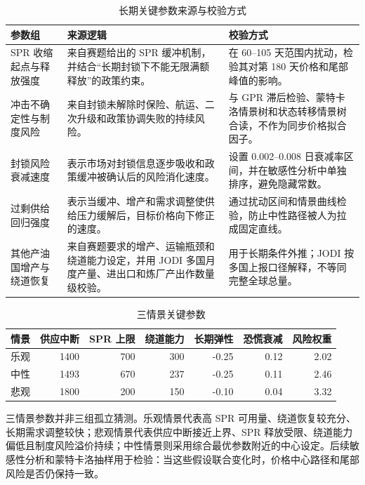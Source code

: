\begin{table}[htbp]
\centering
\caption{长期关键参数来源与校验方式}
\label{tab:long-parameter-audit}
\begin{tabularx}{\linewidth}{lX X}
\toprule
参数组 & 来源逻辑 & 校验方式 \\
\midrule
SPR 收缩起点与释放强度 & 来自赛题给出的 SPR 缓冲机制，并结合“长期封锁下不能无限满额释放”的政策约束。 & 在 60--105 天范围内扰动，检验其对第 180 天价格和尾部峰值的影响。 \\
冲击不确定性与制度风险 & 来自封锁未解除时保险、航运、二次升级和政策协调失败的持续风险。 & 与 GPR 滞后检验、蒙特卡洛情景树和状态转移情景树合读，不作为同步价格拟合因子。 \\
封锁风险衰减速度 & 表示市场对封锁信息逐步吸收和政策缓冲被确认后的风险消化速度。 & 设置 0.002--0.008 日衰减率区间，并在敏感性分析中单独排序，避免隐藏常数。 \\
过剩供给回归强度 & 表示当缓冲、增产和需求调整使供给压力缓解后，目标价格向下修正的速度。 & 通过扰动区间和情景曲线检验，防止中性路径被人为拉成固定直线。 \\
其他产油国增产与绕道恢复 & 来自赛题要求的增产、运输瓶颈和绕道能力设定，并用 JODI 多国月度产量、进出口和炼厂产出作数量级校验。 & 用于长期条件外推；JODI 按多国上报口径解释，不等同完整全球总量。 \\
\bottomrule
\end{tabularx}
\end{table}


\begin{table}[htbp]
\centering
\caption{三情景关键参数}
\begin{tabular}{lrrrrrr}
\toprule
情景 & 供应中断 & SPR 上限 & 绕道能力 & 长期弹性 & 恐慌衰减 & 风险权重 \\
\midrule
乐观 & 1400 & 700 & 300 & -0.25 & 0.12 & 2.02 \\
中性 & 1493 & 670 & 237 & -0.25 & 0.11 & 2.46 \\
悲观 & 1800 & 200 & 150 & -0.10 & 0.04 & 3.32 \\
\bottomrule
\end{tabular}
\end{table}

三情景参数并非三组孤立猜测。乐观情景代表高 SPR 可用量、绕道恢复较充分、长期需求调整较快；悲观情景代表供应中断接近上界、SPR 释放受限、绕道能力偏低且制度风险溢价持续；中性情景则采用综合最优参数附近的中心设定。后续敏感性分析和蒙特卡洛抽样用于检验：当这些假设联合变化时，价格中心路径和尾部风险是否仍保持一致。

